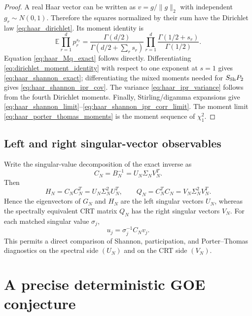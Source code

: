 \documentclass[11pt]{amsart}
\numberwithin{equation}{section}
\theoremstyle{plain}
\theoremstyle{definition}
\theoremstyle{remark}
\begin{document}
\begin{proof}
A real Haar vector can be written as $v=g/\|g\|_2$ with independent $g_r\sim N(0,1)$.  Therefore the squares normalized by their sum have the Dirichlet law \eqref{eq:haar_dirichlet}.  Its moment identity is
\begin{equation}
\mathbb E\prod_{r=1}^d p_r^{s_r}
=\frac{\Gamma(d/2)}{\Gamma(d/2+\sum_r s_r)}
\prod_{r=1}^d
\frac{\Gamma(1/2+s_r)}{\Gamma(1/2)}.
\label{eq:dirichlet_moment_identity}
\end{equation}
Equation \eqref{eq:haar_Mq_exact} follows directly.  Differentiating \eqref{eq:dirichlet_moment_identity} with respect to one exponent at $s=1$ gives \eqref{eq:haar_shannon_exact}; differentiating the mixed moments needed for $S_{\rm Sh}P_2$ gives \eqref{eq:haar_shannon_ipr_cov}.  The variance \eqref{eq:haar_ipr_variance} follows from the fourth Dirichlet moments.  Finally, Stirling/digamma expansions give \eqref{eq:haar_shannon_limit}--\eqref{eq:haar_shannon_ipr_corr_limit}.  The moment limit \eqref{eq:haar_porter_thomas_moments} is the moment sequence of $\chi_1^2$.
\end{proof}

\subsection{Left and right singular-vector observables}
\label{subsec:left_right_singular_vectors}
Write the singular-value decomposition of the exact inverse as
\begin{equation}
C_N=B_N^{-1}=U_N\Sigma_NV_N^T.
\label{eq:C_svd}
\end{equation}
Then
\begin{equation}
H_N=C_NC_N^T=U_N\Sigma_N^2U_N^T,
\qquad
Q_N=C_N^TC_N=V_N\Sigma_N^2V_N^T.
\label{eq:left_right_grams}
\end{equation}
Hence the eigenvectors of $G_N$ and $H_N$ are the left singular vectors $U_N$, whereas the spectrally equivalent CRT matrix $Q_N$ has the right singular vectors $V_N$.  For each matched singular value $\sigma_j$,
\begin{equation}
u_j=\sigma_j^{-1}C_Nv_j.
\label{eq:left_right_vector_map}
\end{equation}
This permits a direct comparison of Shannon, participation, and Porter--Thomas diagnostics on the spectral side $(U_N)$ and on the CRT side $(V_N)$.

\section{A precise deterministic GOE conjecture}
\label{sec:goe_conjecture}
\end{document}
